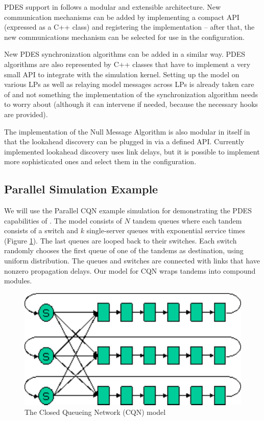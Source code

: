 PDES support in {\opp} follows a modular and extensible architecture.
New communication mechanisms can be added by implementing a compact
API (expressed as a C++ class) and registering the implementation --
after that, the new communications mechanism can be selected for use
in the configuration.

New PDES synchronization algorithms can be added in a similar way.
PDES algorithms are also represented by C++ classes that have
to implement a very small API
to integrate with the simulation kernel.
Setting up the model on various LPs as well as relaying
model messages across LPs is already taken care of and
not something the implementation of the synchronization algorithm
needs to worry about (although it can intervene if needed,
because the necessary hooks are provided).

The implementation of the Null Message Algorithm is also
modular in itself in that the lookahead discovery can be plugged
in via a defined API. Currently implemented lookahead
discovery uses link delays, but it is possible to
implement more sophisticated ones and select them in the
configuration.



\subsection{Parallel Simulation Example}

We will use the Parallel CQN example simulation for demonstrating the
PDES capabilities of {\opp}.
The model consists of $N$ tandem queues where each tandem consists
of a switch and $k$ single-server queues with exponential service times
(Figure \ref{fig:cqn-model}).
The last queues are looped back to their switches. Each switch
randomly chooses the first queue of one of the tandems as destination,
using uniform distribution. The queues and switches are connected
with links that have nonzero propagation delays.
Our {\opp} model for CQN wraps tandems into compound modules.


\begin{figure}[htbp]
  \begin{center}
    \includegraphics{figures/cqn-model}
    \caption{The Closed Queueing Network (CQN) model}
    \label{fig:cqn-model}
  \end{center}
\end{figure}

